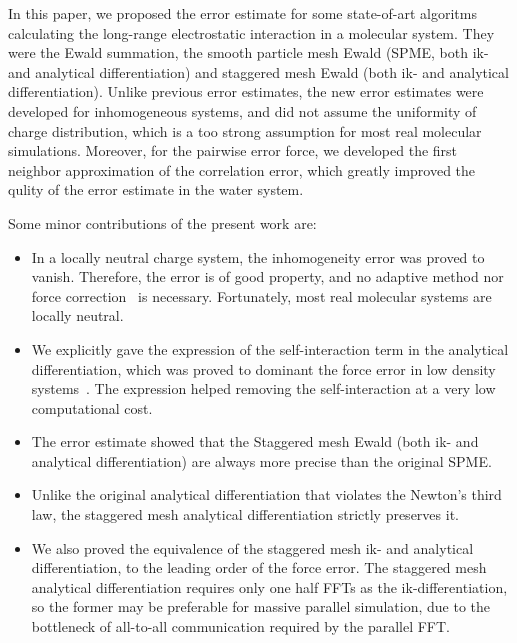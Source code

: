 \documentclass[aps,pre,preprint]{revtex4}
\begin{document}
In this paper, we proposed the error estimate for some state-of-art
algoritms calculating the long-range electrostatic interaction
in a molecular system. They were the Ewald summation, the smooth
particle mesh Ewald (SPME, both ik- and analytical differentiation)
and staggered mesh Ewald (both ik- and analytical differentiation).
Unlike previous error estimates, the new error estimates were
developed for inhomogeneous systems, and did not assume
the uniformity of charge distribution, which is a too strong assumption
for most real molecular simulations.
Moreover, for the pairwise error force, we developed the
first neighbor approximation of the correlation error, which greatly
improved the qulity of the error estimate in the water system.

Some minor contributions of the present work are:
\begin{itemize}
\item In a locally neutral charge system, the inhomogeneity
  error was proved to vanish. Therefore, the error
  is of good property, and no adaptive method nor
  force correction~\cite{wang2012} is necessary. Fortunately, most
  real molecular systems are locally neutral.
\item We explicitly gave the expression of the self-interaction term
  in the analytical differentiation, which was proved to dominant the
  force error in low density systems~\cite{cerutti2009staggered}.  The
  expression helped removing the self-interaction at a very low
  computational cost.
\item The error estimate showed that the Staggered mesh Ewald
  (both ik- and analytical differentiation) are always more precise than
  the original SPME.
\item Unlike the original analytical differentiation
  that violates the Newton's third law, the staggered mesh analytical
  differentiation strictly preserves it.
\item We also proved the equivalence of the staggered mesh ik- and analytical
  differentiation, to the leading order of the force error.
  The staggered mesh analytical differentiation requires only one half
  FFTs as the ik-differentiation, so the former may be preferable
  for massive parallel simulation, due to the bottleneck of all-to-all
  communication required by the parallel FFT.
\end{itemize}
\end{document}
